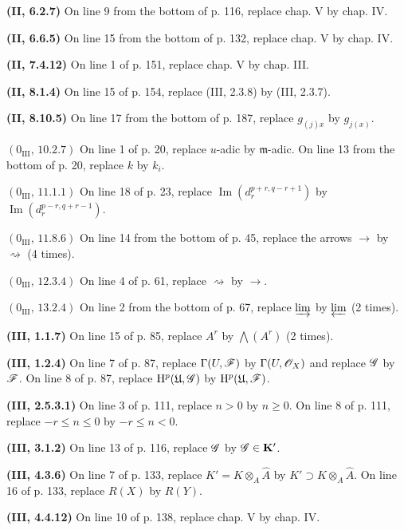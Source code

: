 \noindent\textbf{(II, 6.2.7)} On line 9 from the bottom of p. 116, replace
chap. V by chap. IV.

\noindent\textbf{(II, 6.6.5)} On line 15 from the bottom of p. 132, replace
chap. V by chap. IV.

\noindent\textbf{(II, 7.4.12)} On line 1 of p. 151, replace chap. V by chap.
III.

\noindent\textbf{(II, 8.1.4)} On line 15 of p. 154, replace (III, 2.3.8) by
(III, 2.3.7).

\noindent\textbf{(II, 8.10.5)} On line 17 from the bottom of p. 187, replace
$g_{(j)x}$ by $g_{j(x)}$.

\noindent\textbf{$(0_{\mathrm{III}},\,10.2.7)$} On line 1 of p. 20, replace
$u$-adic by $\mathfrak m$-adic. On line 13 from the bottom of p. 20, replace
$k$ by $k_i$.

\noindent\textbf{$(0_{\mathrm{III}},\,11.1.1)$} On line 18 of p. 23, replace
$\operatorname{Im}(d_r^{p+r,q-r+1})$ by
$\operatorname{Im}(d_r^{p-r,q+r-1})$.

\noindent\textbf{$(0_{\mathrm{III}},\,11.8.6)$} On line 14 from the bottom of
p. 45, replace the arrows $\to$ by $\rightsquigarrow$ (4 times).

\noindent\textbf{$(0_{\mathrm{III}},\,12.3.4)$} On line 4 of p. 61, replace
$\rightsquigarrow$ by $\to$.

\noindent\textbf{$(0_{\mathrm{III}},\,13.2.4)$} On line 2 from the bottom of
p. 67, replace $\varinjlim$ by $\varprojlim$ (2 times).

\noindent\textbf{(III, 1.1.7)} On line 15 of p. 85, replace $A^r$ by
$\bigwedge(A^r)$ (2 times).

\noindent\textbf{(III, 1.2.4)} On line 7 of p. 87, replace
$\Gamma(U,\mathscr{F})$ by $\Gamma(U,\mathscr{O}_X)$ and replace $\mathscr{G}$ by $\mathscr{F}$.
On line 8 of p. 87, replace $\mathrm{H}^p(\mathfrak U,\mathscr{G})$ by
$\mathrm{H}^p(\mathfrak U,\mathscr{F})$.

\noindent\textbf{(III, 2.5.3.1)} On line 3 of p. 111, replace $n>0$ by
$n\geq0$. On line 8 of p. 111, replace $-r\leq n\leq0$ by $-r\leq n<0$.

\noindent\textbf{(III, 3.1.2)} On line 13 of p. 116, replace $\mathscr{G}$ by
$\mathscr{G}\in\mathbf K'$.

\noindent\textbf{(III, 4.3.6)} On line 7 of p. 133, replace
$K'=K\otimes_A\widehat A$ by $K'\supset K\otimes_A\widehat A$. On line 16 of
p. 133, replace $R(X)$ by $R(Y)$.

\noindent\textbf{(III, 4.4.12)} On line 10 of p. 138, replace chap. V by
chap. IV.

